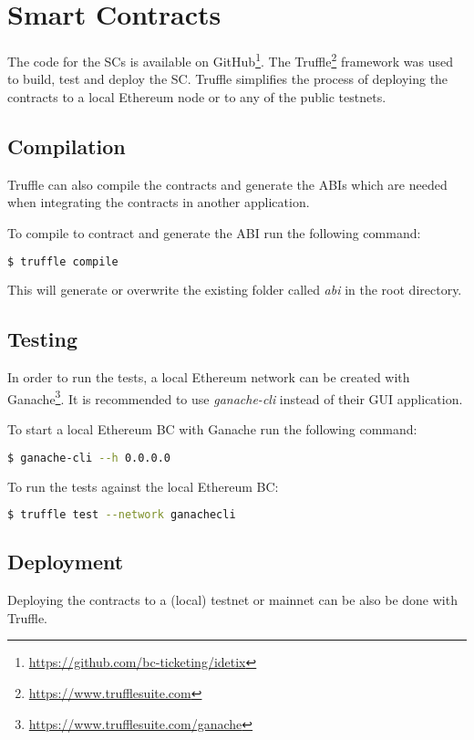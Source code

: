 \section{Smart Contracts}
The code for the SCs is available on GitHub\footnote{\href{https://github.com/bc-ticketing/idetix}{https://github.com/bc-ticketing/idetix}}. The Truffle\footnote{\href{https://www.trufflesuite.com}{https://www.trufflesuite.com}} framework was used to build, test and deploy the SC. Truffle simplifies the process of deploying the contracts to a local Ethereum node or to any of the public testnets.

\subsection{Compilation}
Truffle can also compile the contracts and generate the ABIs which are needed when integrating the contracts in another application.

\noindent To compile to contract and generate the ABI run the following command:
\begin{lstlisting}[language=bash]
  $ truffle compile
\end{lstlisting}

This will generate or overwrite the existing folder called \textit{abi} in the root directory. 

\subsection{Testing}

In order to run the tests, a local Ethereum network can be created with Ganache\footnote{\href{https://www.trufflesuite.com/ganache}{https://www.trufflesuite.com/ganache}}. It is recommended to use \textit{ganache-cli} instead of their GUI application.

\noindent To start a local Ethereum BC with Ganache run the following command:
\begin{lstlisting}[language=bash]
  $ ganache-cli --h 0.0.0.0
\end{lstlisting}

\noindent To run the tests against the local Ethereum BC:
\begin{lstlisting}[language=bash]
  $ truffle test --network ganachecli
\end{lstlisting}

\subsection{Deployment}
Deploying the contracts to a (local) testnet or mainnet can be also be done with Truffle. 

